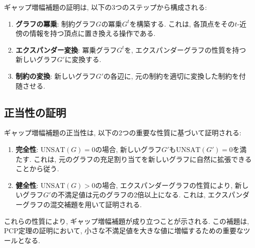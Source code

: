 ギャップ増幅補題の証明は, 以下の3つのステップから構成される:

\begin{enumerate}
\item \textbf{グラフの冪乗}: 制約グラフ$G$の冪乗$G^t$を構築する. これは, 各頂点をその$t$-近傍の情報を持つ頂点に置き換える操作である.

\item \textbf{エクスパンダー変換}: 冪乗グラフ$G^t$を, エクスパンダーグラフの性質を持つ新しいグラフ$G'$に変換する.

\item \textbf{制約の変換}: 新しいグラフ$G'$の各辺に, 元の制約を適切に変換した制約を付随させる.
\end{enumerate}

\subsection{正当性の証明}

ギャップ増幅補題の正当性は, 以下の2つの重要な性質に基づいて証明される:

\begin{enumerate}
\item \textbf{完全性}: $\mathrm{UNSAT}(G) = 0$の場合, 新しいグラフ$G'$も$\mathrm{UNSAT}(G') = 0$を満たす. これは, 元のグラフの充足割り当てを新しいグラフに自然に拡張できることから従う.

\item \textbf{健全性}: $\mathrm{UNSAT}(G) > 0$の場合, エクスパンダーグラフの性質により, 新しいグラフ$G'$の不満足値は元のグラフの2倍以上になる. これは, エクスパンダーグラフの混交補題を用いて証明される.
\end{enumerate}

これらの性質により, ギャップ増幅補題が成り立つことが示される. この補題は, PCP定理の証明において, 小さな不満足値を大きな値に増幅するための重要なツールとなる.